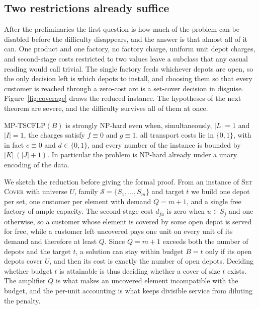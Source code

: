 

\subsection{Two restrictions already suffice}\label{sec:cover}

After the preliminaries the first question is how much of the problem can
be disabled before the difficulty disappears, and the answer is that
almost all of it can. One product and one factory, no factory charge,
uniform unit depot charges, and second-stage costs restricted to two
values leave a subclass that any casual reading would call trivial. The single factory feeds whichever
depots are open, so the only
decision left is which depots to install, and choosing them so that every
customer is reached through a zero-cost arc is a set-cover decision in
disguise. Figure~\ref{fig:coverage} draws the reduced instance. The
hypotheses of the next theorem are severe, and the difficulty survives all
of them at once.



\begin{theorem}\label{thm:cover}
$\mathrm{MP\text{-}TSCFLP}(B)$ is strongly NP-hard even when,
simultaneously, $|L|=1$ and $|I|=1$, the charges satisfy $f\equiv 0$ and
$g\equiv 1$, all transport costs lie in $\{0,1\}$, with in fact
$c\equiv 0$ and $d\in\{0,1\}$, and every number of the instance is bounded
by $|K|\,(|J|+1)$. In particular the problem is NP-hard already under a
unary encoding of the data.
\end{theorem}

We sketch the reduction before giving the formal proof. From an
instance of \textsc{Set Cover} with universe $U$, family
$\mathcal S=\{S_1,\dots,S_m\}$ and target $t$ we build one depot per set,
one customer per element with demand $Q=m+1$, and a single free factory
of ample capacity. The second-stage cost $d_{ju}$ is zero when
$u\in S_j$ and one otherwise, so a customer whose element is covered by
some open depot is served for free, while a customer left uncovered pays
one unit on every unit of its demand and therefore at least $Q$. Since
$Q=m+1$ exceeds both the number of depots and the target $t$, a solution can
stay within budget $B=t$ only if its open depots cover $U$, and then its
cost is exactly the number of open depots. Deciding whether budget $t$ is
attainable is thus deciding whether a cover of size $t$ exists. The
amplifier $Q$ is what makes an uncovered element incompatible with the
budget, and the per-unit accounting is what keeps
divisible service from diluting the penalty.


